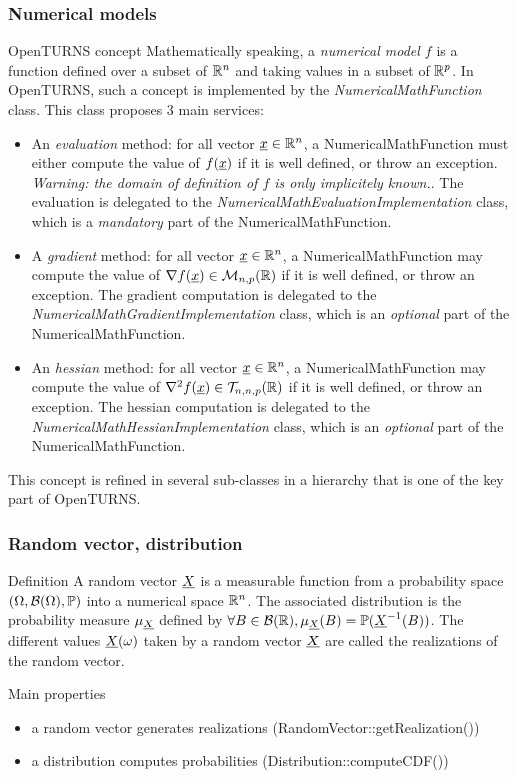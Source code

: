 \documentclass[8pt]{beamer}
\begin{document}
\begin{frame}
  \frametitle{Numerical models}
  \begin{block}{OpenTURNS concept}
    Mathematically speaking, a \emph{numerical model $f$} is a function defined over a subset of $\R^n$ and taking values in a subset of $\R^p$. In OpenTURNS, such a concept is implemented by the \emph{NumericalMathFunction} class. This class proposes 3 main services:
    \begin{itemize}
    \item An \emph{evaluation} method: for all vector $\vect{x}\in\R^n$, a NumericalMathFunction must either compute the value of $f(\vect{x})$ if it is well defined, or throw an exception. \emph{Warning: the domain of definition of $f$ is only implicitely known.}. The evaluation is delegated to the \emph{NumericalMathEvaluationImplementation} class, which is a \emph{mandatory} part of the NumericalMathFunction.
    \item A \emph{gradient} method: for all vector $\vect{x}\in\R^n$, a NumericalMathFunction may compute the value of $\nabla f(\vect{x})\in\mathcal{M}_{n,p}(\R)$ if it is well defined, or throw an exception. The gradient computation is delegated to the \emph{NumericalMathGradientImplementation} class, which is an \emph{optional} part of the NumericalMathFunction.
    \item An \emph{hessian} method: for all vector $\vect{x}\in\R^n$, a NumericalMathFunction may compute the value of $\nabla^2 f(\vect{x})\in\mathcal{T}_{n,n,p}(\R)$ if it is well defined, or throw an exception. The hessian computation is delegated to the \emph{NumericalMathHessianImplementation} class, which is an \emph{optional} part of the NumericalMathFunction.
    \end{itemize}
  \end{block}
  This concept is refined in several sub-classes in a hierarchy that is one of the key part of OpenTURNS.
\end{frame}
\begin{frame}
  \frametitle{Random vector, distribution}
  \begin{block}{Definition}
    A \alert{random vector $\vect{X}$} is a measurable function from a probability space $(\Omega, \mathcal{B}(\Omega), \P)$ into a numerical space $\R^n$. The associated \alert{distribution} is the probability measure $\mu_{\vect{X}}$ defined by $\forall B\in\mathcal{B}(\R), \mu_{\vect{X}}(B)=\P(\vect{X}^{-1}(B))$. The different values $\vect{X}(\omega)$ taken by a random vector $\vect{X}$ are called the \alert{realizations} of the random vector.
  \end{block}
  \begin{block}{Main properties}
    \begin{itemize}
    \item a random vector generates realizations (\alert{RandomVector::getRealization()})
    \item a distribution computes probabilities (\alert{Distribution::computeCDF()})
    \end{itemize}
  \end{block}
\end{frame}
\end{document}
